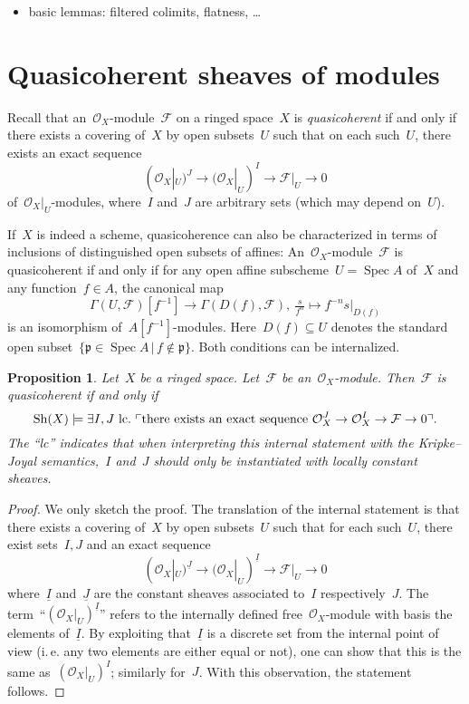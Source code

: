 \documentclass[10pt]{amsart}
\makeatletter
\theoremstyle{definition}
\theoremstyle{plain}
\newtheorem{prop}[defn]{Proposition}
\theoremstyle{remark}
\newcommand{\F}{\mathcal{F}}
\renewcommand{\O}{\mathcal{O}}
\newcommand{\ppp}{\mathfrak{p}}
\newcommand{\ul}[1]{\underline{#1}}
\newcommand{\Sh}{\mathrm{Sh}}
\DeclareMathOperator{\Spec}{Spec}
\newcommand{\?}{\,{:}\,}
\renewcommand{\_}{\mathpunct{.}\,}
\newcommand{\speak}[1]{\ulcorner\text{\textnormal{#1}}\urcorner}
\newcommand{\ie}{i.\,e.\@\xspace}
\makeatother
\begin{document}
\begin{itemize}
\item basic lemmas: filtered colimits, flatness, \ldots
\end{itemize}


\section{Quasicoherent sheaves of modules}
\label{sect:qcoh}

Recall that an~$\O_X$-module~$\F$ on a ringed space~$X$ is \emph{quasicoherent}
if and only if there exists a covering of~$X$ by open subsets~$U$ such that on
each such~$U$, there exists an exact sequence
\[ (\O_X|_U)^J \longrightarrow (\O_X|_U)^I \longrightarrow \F|_U \longrightarrow 0 \]
of~$\O_X|_U$-modules, where~$I$ and~$J$ are arbitrary sets (which may depend
on~$U$).

If~$X$ is indeed a scheme, quasicoherence can also be characterized in
terms of inclusions of distinguished open subsets of affines:
An~$\O_X$-module~$\F$ is quasicoherent if and only if for any open affine
subscheme~$U = \Spec A$ of~$X$ and any function~$f \in A$, the canonical map
\[ \Gamma(U,\F)[f^{-1}] \longrightarrow \Gamma(D(f),\F),\
  \tfrac{s}{f^n} \longmapsto f^{-n} s|_{D(f)} \]
is an isomorphism of~$A[f^{-1}]$-modules. Here~$D(f) \subseteq U$ denotes the
standard open subset~$\{ \ppp \in \Spec A \,|\, f \not\in \ppp \}$. Both
conditions can be internalized.

\begin{prop}Let~$X$ be a ringed space. Let~$\F$ be an~$\O_X$-module. Then~$\F$
is quasicoherent if and only if
\[ \Sh(X) \models \exists I,J\ \mathrm{lc}\_ \speak{there exists an
  exact sequence~$\O_X^J \to \O_X^I \to \F \to 0$}. \]
The ``\textnormal{lc}'' indicates that when interpreting this internal statement with the
Kripke--Joyal semantics,~$I$ and~$J$ should only be instantiated with
\emph{locally constant} sheaves.
\end{prop}
\begin{proof} We only sketch the proof.
The translation of the internal statement is that there exists a covering
of~$X$ by open subsets~$U$ such that for each such~$U$, there exist sets~$I,J$
and an exact sequence
\[ (\O_X|_U)^{\ul{J}} \longrightarrow (\O_X|_U)^{\ul{I}} \longrightarrow \F|_U
\longrightarrow 0 \]
where~$\ul{I}$ and~$\ul{J}$ are the constant sheaves associated to~$I$
respectively~$J$. The term~``$(\O_X|_U)^{\ul{I}}$'' refers to the internally
defined free~$\O_X$-module with basis the elements of~$\ul{I}$. By exploiting
that~$\ul{I}$ is a discrete set from the internal point of view (\ie any two
elements are either equal or not), one can show that this is the same
as~$(\O_X|_U)^I$; similarly for~$J$. With this observation, the statement
follows.
\end{proof}
\end{document}
